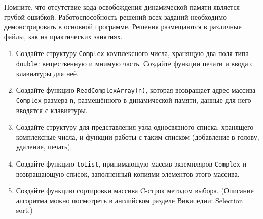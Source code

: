 Помните, что отсутствие кода освобождения динамической памяти является грубой
ошибкой. Работоспособность решений всех заданий необходимо демонстрировать в
основной программе. Решения размещаются в различные файлы, как на
практических занятиях.
\begin{enumerate}
    \itemsep=\myitemsep
    \item Создайте структуру \texttt{Complex} комплексного числа, хранящую два
    поля типа \texttt{double}: вещественную и мнимую часть. Создайте функции
    печати и ввода с клавиатуры для неё.
    
    \item Создайте функцию \texttt{ReadComplexArray(n)}, которая 
    возвращает адрес массива \texttt{Complex} размера \texttt{n},
    размещённого в динамической памяти, данные для него вводятся с
    клавиатуры.
    
    \item Создайте структуру для представления узла односвязного списка,
    хранящего комплексные числа, и функции работы с таким списком (добавление в
    голову, удаление, печать).
    
    \item Создайте функцию \texttt{toList}, принимающую массив экземпляров
    \texttt{Complex} и возвращающую список, заполненный копиями элементов этого
    массива.

    \item Создайте функцию сортировки массива C-строк
    методом выбора. (Описание алгоритма можно посмотреть в английском разделе
    Википедии: Selection sort.)
\end{enumerate}